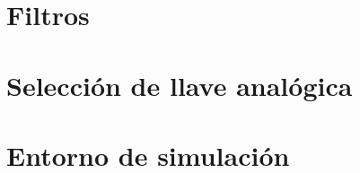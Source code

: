 







\tableofcontents
\newpage


%	
%	
\section{Filtros}
	\label{Ejercicio-2}
	

\section{Selección de llave analógica}
	\label{Ejercicio-3}
	
	
%	
%	

\section{Entorno de simulación}
	\label{Ejercicio-5}
	
